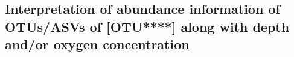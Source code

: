 \documentclass[11 pt,]{article}
\newenvironment{Shaded}{\begin{snugshade}}{\end{snugshade}}
\newcommand{\KeywordTok}[1]{\textcolor[rgb]{0.13,0.29,0.53}{\textbf{#1}}}
\newcommand{\StringTok}[1]{\textcolor[rgb]{0.31,0.60,0.02}{#1}}
\newcommand{\CommentTok}[1]{\textcolor[rgb]{0.56,0.35,0.01}{\textit{#1}}}
\newcommand{\ControlFlowTok}[1]{\textcolor[rgb]{0.13,0.29,0.53}{\textbf{#1}}}
\newcommand{\OperatorTok}[1]{\textcolor[rgb]{0.81,0.36,0.00}{\textbf{#1}}}
\newcommand{\NormalTok}[1]{#1}
\begin{document}
\subsection{\texorpdfstring{Interpretation of abundance information of
OTUs/ASVs of {[}OTU****{]} along with depth and/or oxygen concentration
\label{sec:ASVabundances}}{Interpretation of abundance information of OTUs/ASVs of {[}OTU****{]} along with depth and/or oxygen concentration }}\label{interpretation-of-abundance-information-of-otusasvs-of-otu-along-with-depth-andor-oxygen-concentration}

\begin{Shaded}
\end{Shaded}
\end{document}
